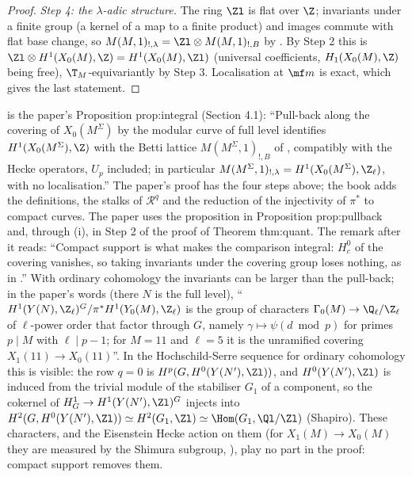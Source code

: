 \begin{proof}
\emph{Step 4: the $\lambda$-adic structure.} The ring $\Zl$ is flat over $\Z$; invariants under a finite group (a kernel of a map to a finite product) and images commute with flat base change, so
$M(M,1)_{!,\lambda}=\Zl\otimes M(M,1)_{!,B}$ by \cite[Section 1.2.3]{DFG04}. By Step 2 this is $\Zl\otimes H^1(X_0(M),\Z)=H^1(X_0(M),\Zl)$ (universal coefficients, $H_1(X_0(M),\Z)$ being
free), $\T_M$-equivariantly by Step 3. Localisation at $\mf m$ is exact, which gives the last statement.
\end{proof}

\begin{paperlink}
 is the paper's Proposition prop:integral (Section 4.1): ``Pull-back along the covering of $X_0(M^\Sigma)$ by the modular curve of full level identifies
$H^1(X_0(M^\Sigma),\Z)$ with the Betti lattice $M(M^\Sigma,1)_{!,B}$ of \cite[\S1.4.2]{DFG04}, compatibly with the Hecke operators, $U_p$ included; in particular
$M(M^\Sigma,1)_{!,\lambda}=H^1(X_0(M^\Sigma),\Z_\ell)$, with no localisation.'' The paper's proof has the four steps above; the book adds the definitions, the stalks of $\mathcal R^q$ and the reduction of the injectivity of $\pi^*$ to compact curves. The paper uses
the proposition in Proposition prop:pullback and, through (i), in Step 2 of the proof of Theorem thm:quant. The remark after it reads: ``Compact support is what
makes the comparison integral: $H^0_c$ of the covering vanishes, so taking invariants under the covering group loses nothing, as in \cite[Lemma 1.1]{DFG04}.'' With ordinary cohomology the
invariants can be larger than the pull-back; in the paper's words (there $N$ is the full level), ``$H^1(Y(N),\Z_\ell)^G/\pi^*H^1(Y_0(M),\Z_\ell)$ is the group of characters
$\Gamma_0(M)\to\Q_\ell/\Z_\ell$ of $\ell$-power order that factor through $G$, namely $\gamma\mapsto\psi(d\bmod p)$ for primes $p\mid M$ with $\ell\mid p-1$; for $M=11$ and $\ell=5$ it is the unramified
covering $X_1(11)\to X_0(11)$''. In the Hochschild-Serre sequence for ordinary cohomology this is visible: the row $q=0$ is $H^p(G,H^0(Y(N'),\Zl))$, and $H^0(Y(N'),\Zl)$ is induced from the trivial module
of the stabiliser $G_1$ of a component, so the cokernel of $H^1_G\to H^1(Y(N'),\Zl)^G$ injects into $H^2(G,H^0(Y(N'),\Zl))\simeq H^2(G_1,\Zl)\simeq\Hom(G_1,\Ql/\Zl)$ (Shapiro). These characters, and the
Eisenstein Hecke action on them (for $X_1(M)\to X_0(M)$ they are measured by the Shimura subgroup, ), play no part in the proof: compact support removes them.
\end{paperlink}

